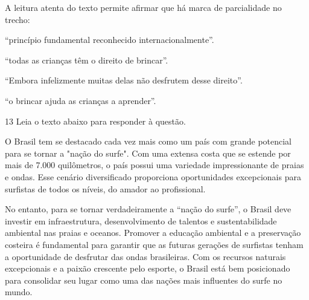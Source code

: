 A leitura atenta do texto permite afirmar que há marca de parcialidade
no trecho:

\begin{escolha}
  
    \item ``princípio fundamental reconhecido internacionalmente''.
  
    \item ``todas as crianças têm o direito de brincar''.
  
    \item ``Embora infelizmente muitas delas não desfrutem desse direito''.
  
    \item ``o brincar ajuda as crianças a aprender''.

\end{escolha}

\num{13} Leia o texto abaixo para responder à questão. 

\begin{myquote}




O Brasil tem se destacado cada vez mais como um país com grande potencial para
se tornar a "nação do surfe". Com uma extensa costa que se estende por mais de
7.000 quilômetros, o país possui uma variedade impressionante de praias e
ondas. Esse cenário diversificado proporciona oportunidades excepcionais para
surfistas de todos os níveis, do amador ao profissional. 

No entanto, para se tornar verdadeiramente a ``nação do surfe'', o Brasil deve
investir em infraestrutura, desenvolvimento de talentos e
sustentabilidade ambiental nas praias e oceanos. Promover a educação ambiental
e a preservação costeira é fundamental para garantir que as futuras gerações
de surfistas tenham a oportunidade de desfrutar das ondas brasileiras. Com os
recursos naturais excepcionais e a paixão crescente pelo esporte, o Brasil
está bem posicionado para consolidar seu lugar como uma das nações mais
influentes do surfe no mundo.

\end{myquote}

